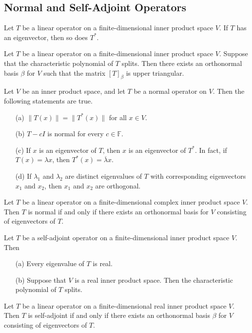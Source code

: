 \subsection{Normal and Self-Adjoint Operators}
\begin{lemma}
    Let \(T\) be a linear operator on a finite-dimensional inner product space \(V\). If \(T\) has an eigenvector, then so does \(T^*\).
\end{lemma}
\vspace{3cm}
\begin{theorem}
    Let \(T\) be a linear operator on a finite-dimensional inner product space \(V\). Suppose that the characteristic polynomial of \(T\) splits. Then there exists an orthonormal basis \(\beta\) for \(V\) such that the matrix \([T]_{\beta}\) is upper triangular.
\end{theorem}
\newpage
\begin{theorem}
    Let \(V\) be an inner product space, and let \(T\) be a normal operator on \(V\). Then the following statements are true.
    \begin{enumerate}
        \item[(a)] \(\lVert T(x) \rVert = \lVert T^*(x) \rVert\) for all \(x \in V\).
        \item[(b)] \(T-cI\) is normal for every \(c \in \mathbb{F}\).
        \item[(c)] If \(x\) is an eigenvector of \(T\), then \(x\) is an eigenvector of \(T^*\). In fact, if \(T(x) = \lambda x\), then \(T^*(x) = \overline{\lambda}x\).
        \item[(d)] If \(\lambda _1\) and \(\lambda _2\) are distinct eigenvalues of \(T\) with corresponding eigenvectors \(x_1\) and \(x_2\), then \(x_1\) and \(x_2\) are orthogonal.
    \end{enumerate}
\end{theorem}
\vspace{5cm} 
\begin{theorem}
    Let \(T\) be a linear operator on a finite-dimensional complex inner product space \(V\). Then \(T\) is normal if and only if there exists an orthonormal basis for \(V\) consisting of eigenvectors of \(T\).
\end{theorem}
\newpage
\begin{lemma}
    Let \(T\) be a self-adjoint operator on a finite-dimensional inner product space \(V\). Then
    \begin{enumerate}
        \item[(a)] Every eigenvalue of \(T\) is real.
        \item[(b)] Suppose that \(V\) is a real inner product space. Then the characteristic polynomial of \(T\) splits. 
    \end{enumerate}
\end{lemma}
\vspace{7cm}
\begin{theorem}
    Let \(T\) be a linear operator on a finite-dimensional real inner product space \(V\). Then \(T\) is self-adjoint if and only if there exists an orthonormal basis \(\beta\) for \(V\) consisting of eigenvectors of \(T\).
\end{theorem}
\vspace{3cm}
